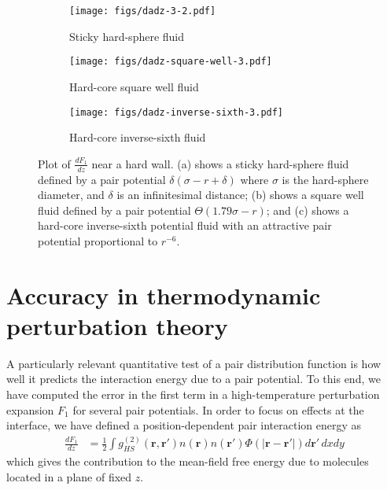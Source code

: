 \documentclass[letterpaper,twocolumn,amsmath,amssymb,pre,aps,10pt]{revtex4-1}
\newcommand{\rr}{\textbf{r}}
\begin{document}
\begin{figure}
  \begin{subfigure}{1.0\columnwidth}
    \texttt{[image: figs/dadz-3-2.pdf]}
    \vspace{-0.8cm}
    \caption{Sticky hard-sphere fluid}\label{fig:dadz-delta}
  \end{subfigure}
  \begin{subfigure}{1.0\columnwidth}
    \texttt{[image: figs/dadz-square-well-3.pdf]}
    \vspace{-0.8cm}
    \caption{Hard-core square well fluid}\label{fig:dadz-square-well}
  \end{subfigure}
  \begin{subfigure}{1.0\columnwidth}
    \texttt{[image: figs/dadz-inverse-sixth-3.pdf]}
    \vspace{-0.8cm}
    \caption{Hard-core inverse-sixth fluid}\label{fig:dadz-inverse-sixth}
  \end{subfigure}
  \caption{Plot of $\frac{dF_1}{dz}$ near a hard wall.  (a) shows a
    sticky hard-sphere fluid defined by a pair potential
    $\delta(\sigma-r+\delta)$ where $\sigma$ is the hard-sphere
    diameter, and $\delta$ is an infinitesimal distance; (b) shows a
    square well fluid defined by a pair potential $\Theta(1.79
    \sigma-r)$; and (c) shows a hard-core inverse-sixth potential
    fluid with an attractive pair potential proportional to $r^{-6}$.
  }
  \label{fig:dadz}
\end{figure}

\section{Accuracy in thermodynamic perturbation theory}

A particularly relevant quantitative test of a pair distribution
function is how well it predicts the interaction energy due to a pair
potential.  To this end, we have computed the error in the first term
in a high-temperature perturbation expansion $F_1$
for several pair potentials.  In order to focus on effects at the
interface, we have defined a position-dependent pair interaction
energy as
\begin{align}
  \frac{dF_1}{dz} &=
  \tfrac12 \int g^{(2)}_{HS}(\rr,\rr')n(\rr)n(\rr')\Phi(|\rr-\rr'|)
  d\rr'\, dxdy\label{eq:da1}
\end{align}
which gives the contribution to the mean-field free energy due to
molecules located in a plane of fixed $z$.
\end{document}
